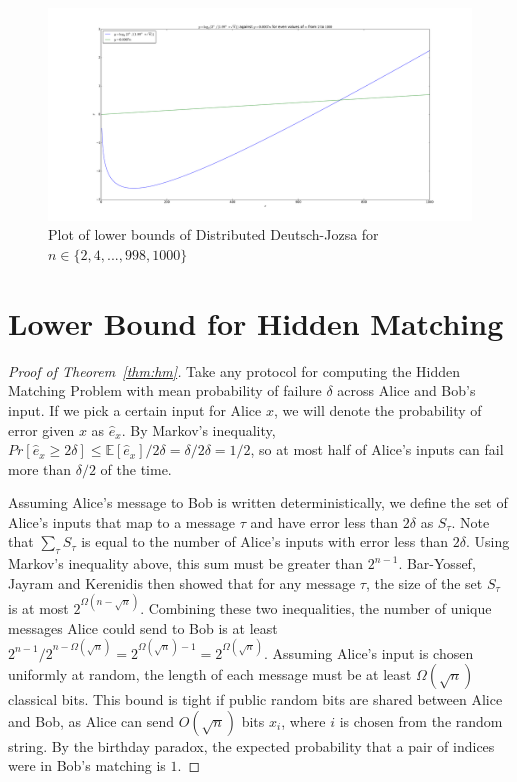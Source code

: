 \documentclass[a4paper]{article}
\begin{document}
\begin{appendices}
        \begin{figure}
            \includegraphics[width=\linewidth]{ddj_bound}
            \caption{Plot of lower bounds of Distributed Deutsch-Jozsa for $n \in \{2, 4,..., 998, 1000\}$}
            \label{fig:ddj-bound}
        \end{figure}

    \section{Lower Bound for Hidden Matching}
    \label{sec:hm-lower-bound}

    \begin{proof}[Proof of Theorem~\ref{thm:hm}]
        Take any protocol for computing the Hidden Matching Problem with mean probability of failure $\delta$ across Alice and Bob's input. If we pick a certain input for Alice $x$, we will denote the probability of error given $x$ as $\hat{e}_x$. By Markov's inequality, $Pr[\hat{e}_x \geq 2\delta] \leq \mathbb{E}[\hat{e}_x]/2\delta = \delta/2\delta = 1/2$, so at most half of Alice's inputs can fail more than $\delta/2$ of the time.

        Assuming Alice's message to Bob is written deterministically, we define the set of Alice's inputs that map to a message $\tau$ and have error less than $2\delta$ as $S_{\tau}$. Note that $\sum_{\tau}S_{\tau}$ is equal to the number of Alice's inputs with error less than $2\delta$. Using Markov's inequality above, this sum must be greater than $2^{n-1}$. Bar-Yossef, Jayram and Kerenidis then showed that for any message $\tau$, the size of the set $S_{\tau}$ is at most $2^{\Omega(n - \sqrt{n})}$. Combining these two inequalities, the number of unique messages Alice could send to Bob is at least $2^{n - 1}/2^{n - \Omega(\sqrt{n})} = 2^{\Omega(\sqrt{n}) - 1} = 2^{\Omega(\sqrt{n})}$. Assuming Alice's input is chosen uniformly at random, the length of each message must be at least $\Omega(\sqrt{n})$ classical bits. This bound is tight if public random bits are shared between Alice and Bob, as Alice can send $O(\sqrt{n})$ bits $x_i$, where $i$ is chosen from the random string. By the birthday paradox, the expected probability that a pair of indices were in Bob's matching is $1$.
    \end{proof}


\end{appendices}
\end{document}
